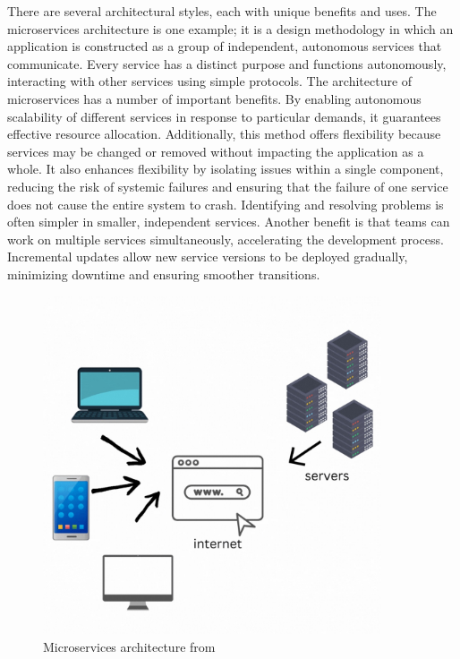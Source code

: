     There are several architectural styles, each with unique benefits and uses. The microservices architecture is one example; it is a design methodology in which an application is constructed as a group of independent, autonomous services that communicate. Every service has a distinct purpose and functions autonomously, interacting with other services using simple protocols. The architecture of microservices has a number of important benefits. By enabling autonomous scalability of different services in response to particular demands, it guarantees effective resource allocation. Additionally, this method offers flexibility because services may be changed or removed without impacting the application as a whole. It also enhances flexibility by isolating issues within a single component, reducing the risk of systemic failures and ensuring that the failure of one service does not cause the entire system to crash. Identifying and resolving problems is often simpler in smaller, independent services. Another benefit is that teams can work on multiple services simultaneously, accelerating the development process. Incremental updates allow new service versions to be deployed gradually, minimizing downtime and ensuring smoother transitions.
    \cite{Vicki}
    \begin{figure}[H]
        \centering
        \includegraphics[width=10cm]{chapters/2/figures/eb6b7a926564d8e2d83f58f00.jpg}
        \caption[Microservices architecture]{Microservices architecture  from~\cite{Vicki}}
        \label{fig:microservices-architecture}
    \end{figure}

